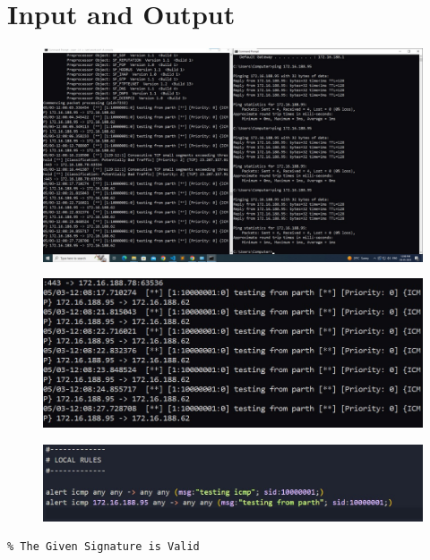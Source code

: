 \documentclass[openany]{book}
\begin{document}
\section{Input and Output}
\begin{figure}[H]
    \centering
    \includegraphics[width=.95\textwidth]{snort1.jpeg}
    \caption{}
\end{figure}
\begin{figure}[H]
    \centering
    \includegraphics[width=.95\textwidth]{snort2.jpeg}
    \caption{}
\end{figure}
\begin{figure}[H]
    \centering
    \includegraphics[width=.95\textwidth]{snort3.jpeg}
    \caption{}
\end{figure}
\begin{verbatim}
% The Given Signature is Valid
\end{verbatim}

% 
\end{document}
